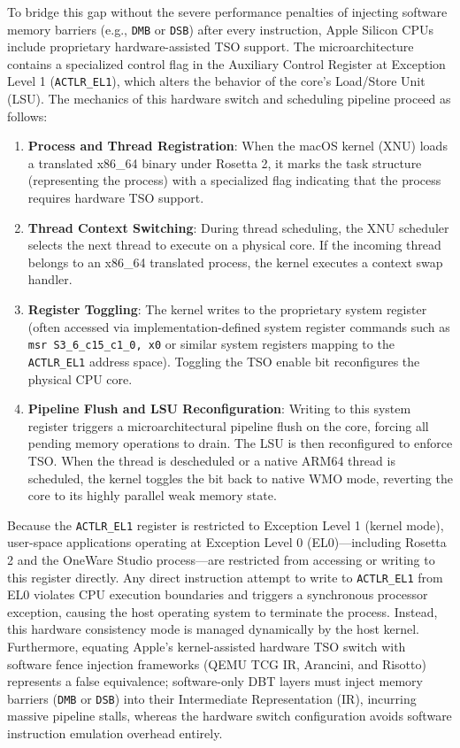 To bridge this gap without the severe performance penalties of injecting software memory barriers (e.g., \texttt{DMB} or \texttt{DSB}) after every instruction, Apple Silicon CPUs include proprietary hardware-assisted TSO support. The microarchitecture contains a specialized control flag in the Auxiliary Control Register at Exception Level 1 (\texttt{ACTLR\_EL1}), which alters the behavior of the core's Load/Store Unit (LSU). The mechanics of this hardware switch and scheduling pipeline proceed as follows:
\begin{enumerate}
    \item \textbf{Process and Thread Registration}: When the macOS kernel (XNU) loads a translated x86\_64 binary under Rosetta 2, it marks the task structure (representing the process) with a specialized flag indicating that the process requires hardware TSO support.
    \item \textbf{Thread Context Switching}: During thread scheduling, the XNU scheduler selects the next thread to execute on a physical core. If the incoming thread belongs to an x86\_64 translated process, the kernel executes a context swap handler.
    \item \textbf{Register Toggling}: The kernel writes to the proprietary system register (often accessed via implementation-defined system register commands such as \texttt{msr S3\_6\_c15\_c1\_0, x0} or similar system registers mapping to the \texttt{ACTLR\_EL1} address space). Toggling the TSO enable bit reconfigures the physical CPU core.
    \item \textbf{Pipeline Flush and LSU Reconfiguration}: Writing to this system register triggers a microarchitectural pipeline flush on the core, forcing all pending memory operations to drain. The LSU is then reconfigured to enforce TSO. When the thread is descheduled or a native ARM64 thread is scheduled, the kernel toggles the bit back to native WMO mode, reverting the core to its highly parallel weak memory state.
\end{enumerate}

Because the \texttt{ACTLR\_EL1} register is restricted to Exception Level 1 (kernel mode), user-space applications operating at Exception Level 0 (EL0)---including Rosetta 2 and the OneWare Studio process---are restricted from accessing or writing to this register directly. Any direct instruction attempt to write to \texttt{ACTLR\_EL1} from EL0 violates CPU execution boundaries and triggers a synchronous processor exception, causing the host operating system to terminate the process. Instead, this hardware consistency mode is managed dynamically by the host kernel. Furthermore, equating Apple's kernel-assisted hardware TSO switch with software fence injection frameworks (QEMU TCG IR, Arancini, and Risotto) represents a false equivalence; software-only DBT layers must inject memory barriers (\texttt{DMB} or \texttt{DSB}) into their Intermediate Representation (IR), incurring massive pipeline stalls, whereas the hardware switch configuration avoids software instruction emulation overhead entirely.

